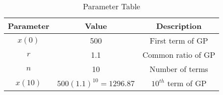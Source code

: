 \begin{table}[ht]
	  \centering
	    \begin{tabular}{|c|c|c|}
		        \hline
			   \textbf{ Parameter} & \textbf{Value} & \textbf{Description} \\
			       \hline
			           $x(0)$ & 500 & First term of GP \\
				       \hline
				           $r$ & 1.1 & Common ratio of GP \\
					       \hline
					           $n$ & 10 & Number of terms   \\
						       \hline
						           $x(10)$ & $500(1.1)^{10} = 1296.87$ & $10^{th}$ term of GP  \\
							       \hline
							         \end{tabular}
								   \vspace{2mm}
								     \caption{Parameter Table}
								       \label{tab:11.9.3.31}
\end{table}
